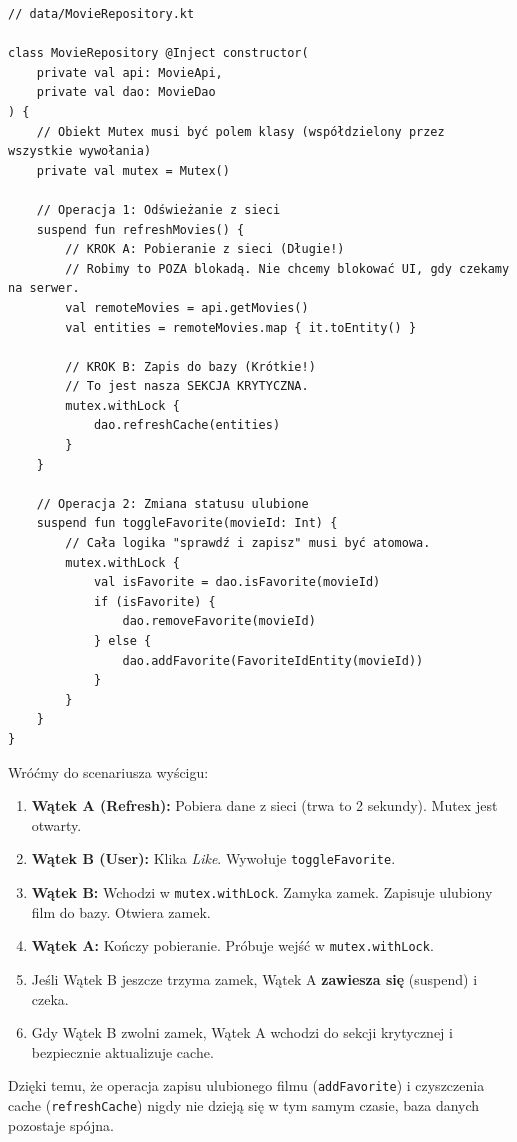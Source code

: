 \begin{verbatim}
// data/MovieRepository.kt

class MovieRepository @Inject constructor(
    private val api: MovieApi,
    private val dao: MovieDao
) {
    // Obiekt Mutex musi być polem klasy (współdzielony przez wszystkie wywołania)
    private val mutex = Mutex()

    // Operacja 1: Odświeżanie z sieci
    suspend fun refreshMovies() {
        // KROK A: Pobieranie z sieci (Długie!)
        // Robimy to POZA blokadą. Nie chcemy blokować UI, gdy czekamy na serwer.
        val remoteMovies = api.getMovies()
        val entities = remoteMovies.map { it.toEntity() }

        // KROK B: Zapis do bazy (Krótkie!)
        // To jest nasza SEKCJA KRYTYCZNA.
        mutex.withLock {
            dao.refreshCache(entities)
        }
    }

    // Operacja 2: Zmiana statusu ulubione
    suspend fun toggleFavorite(movieId: Int) {
        // Cała logika "sprawdź i zapisz" musi być atomowa.
        mutex.withLock {
            val isFavorite = dao.isFavorite(movieId)
            if (isFavorite) {
                dao.removeFavorite(movieId)
            } else {
                dao.addFavorite(FavoriteIdEntity(movieId))
            }
        }
    }
}
\end{verbatim}

Wróćmy do scenariusza wyścigu:
\begin{enumerate}
    \item \textbf{Wątek A (Refresh):} Pobiera dane z sieci (trwa to 2 sekundy). Mutex jest otwarty.
    \item \textbf{Wątek B (User):} Klika \textit{Like}. Wywołuje \texttt{toggleFavorite}.
    \item \textbf{Wątek B:} Wchodzi w \texttt{mutex.withLock}. Zamyka zamek. Zapisuje ulubiony film do bazy. Otwiera zamek.
    \item \textbf{Wątek A:} Kończy pobieranie. Próbuje wejść w \texttt{mutex.withLock}.
    \item Jeśli Wątek B jeszcze trzyma zamek, Wątek A \textbf{zawiesza się} (suspend) i czeka.
    \item Gdy Wątek B zwolni zamek, Wątek A wchodzi do sekcji krytycznej i bezpiecznie aktualizuje cache.
\end{enumerate}

Dzięki temu, że operacja zapisu ulubionego filmu (\texttt{addFavorite}) i czyszczenia cache (\texttt{refreshCache}) nigdy nie dzieją się w tym samym czasie, baza danych pozostaje spójna.

